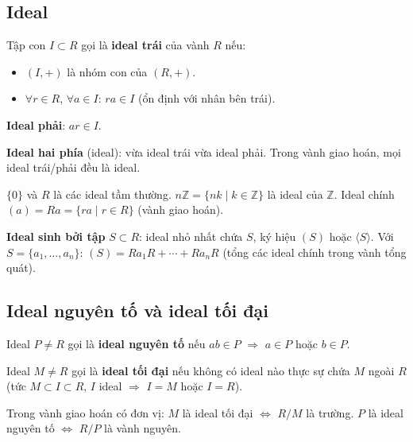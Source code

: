 \documentclass[12pt,a4paper]{article}
\begin{document}
\subsection{Ideal}

\begin{dinhnghia}
  Tập con $I \subset R$ gọi là \textbf{ideal trái} của vành $R$ nếu:
  \begin{itemize}
    \item $(I, +)$ là nhóm con của $(R, +)$.
    \item $\forall r \in R$, $\forall a \in I$: $ra \in I$ (ổn định với nhân bên trái).
  \end{itemize}
  
  \textbf{Ideal phải}: $ar \in I$.
  
  \textbf{Ideal hai phía} (ideal): vừa ideal trái vừa ideal phải. Trong vành giao hoán, mọi ideal trái/phải đều là ideal.
\end{dinhnghia}

\begin{vidu}
  $\{0\}$ và $R$ là các ideal tầm thường. $n\mathbb{Z} = \{nk \mid k \in \mathbb{Z}\}$ là ideal của $\mathbb{Z}$. Ideal chính $(a) = Ra = \{ra \mid r \in R\}$ (vành giao hoán).
\end{vidu}

\begin{dinhnghia}
  \textbf{Ideal sinh bởi tập} $S \subset R$: ideal nhỏ nhất chứa $S$, ký hiệu $(S)$ hoặc $\langle S \rangle$. Với $S = \{a_1, \ldots, a_n\}$: $(S) = Ra_1 R + \cdots + Ra_n R$ (tổng các ideal chính trong vành tổng quát).
\end{dinhnghia}

\subsection{Ideal nguyên tố và ideal tối đại}

\begin{dinhnghia}
  Ideal $P \ne R$ gọi là \textbf{ideal nguyên tố} nếu $ab \in P$ $\Rightarrow$ $a \in P$ hoặc $b \in P$.
\end{dinhnghia}

\begin{dinhnghia}
  Ideal $M \ne R$ gọi là \textbf{ideal tối đại} nếu không có ideal nào thực sự chứa $M$ ngoài $R$ (tức $M \subset I \subset R$, $I$ ideal $\Rightarrow$ $I = M$ hoặc $I = R$).
\end{dinhnghia}

\begin{dinhly}
  Trong vành giao hoán có đơn vị: $M$ là ideal tối đại $\Leftrightarrow$ $R/M$ là trường. $P$ là ideal nguyên tố $\Leftrightarrow$ $R/P$ là vành nguyên.
\end{dinhly}
\end{document}
